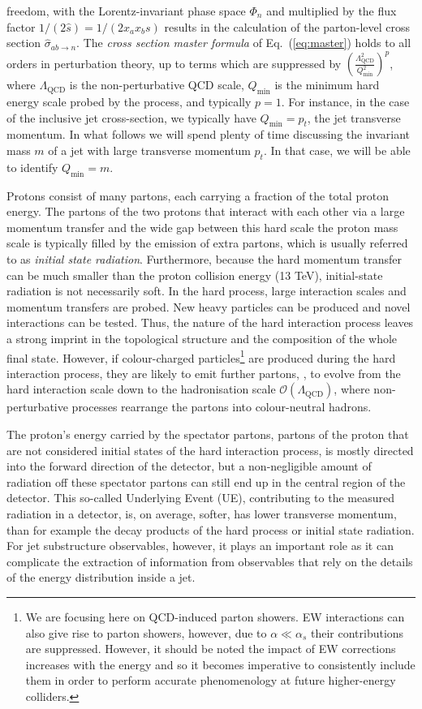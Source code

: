 freedom, with the Lorentz-invariant phase space $\Phi_n$ and
multiplied by the flux factor $1/(2 \hat{s}) = 1/(2 x_a x_b s)$
results in the calculation of the parton-level cross section
$\hat{\sigma}_{ab \to n}$. The {\it cross section master formula} of
Eq.~(\ref{eq:master}) holds to all orders in perturbation theory, up
to terms which are suppressed by
$\left(\frac{\Lambda_\text{QCD}^2}{Q^2_\text{min}}\right)^p$, where $\Lambda_\text{QCD}$ is the non-perturbative QCD scale, $Q_\text{min}$ is the minimum hard energy scale
probed by the process, and typically $p=1$.  
For instance, in the case of the inclusive jet cross-section, we typically have $Q_\text{min}=p_t$, the jet transverse momentum. 
In what follows we will spend plenty of time discussing the invariant mass $m$ of a jet with
large transverse momentum $p_t$. In that case, we will be able to
identify $Q_\text{min}=m$.
%


Protons consist of many partons, each carrying a fraction of the
total proton energy. The partons of the two protons that interact with
each other via a large momentum transfer and the wide gap between this hard scale the proton mass scale is typically filled by the emission of extra partons, which is usually referred to as {\it initial state radiation}. 
Furthermore, because the hard momentum transfer can be much smaller than the proton collision energy (13 TeV), initial-state radiation is not necessarily soft.
%
In the hard process, large interaction scales and momentum transfers are probed. New heavy particles can be produced and novel interactions can be tested. Thus, the nature of the hard interaction process leaves a strong imprint in the topological structure and the composition of the whole final state.
However, if colour-charged particles\footnote{We are focusing here on QCD-induced parton showers. EW interactions can also give rise to parton showers, however, due to $\alpha \ll \alpha_s$ their contributions are suppressed. 
%
However, it should be noted the impact of EW corrections increases with the energy and so it becomes imperative to consistently include them in order to perform accurate phenomenology  at future higher-energy colliders.} are produced during the hard interaction process, they are likely to emit further partons, , to evolve from the hard interaction scale down to the hadronisation scale $\mathcal{O}(\Lambda_\mathrm{QCD})$, where non-perturbative processes rearrange the partons into colour-neutral hadrons. 

The proton's energy carried by the
spectator partons, \ie partons of the proton that are not considered
initial states of the hard interaction process, is mostly directed
into the forward direction of the detector, but a non-negligible
amount of radiation off these spectator partons can still end up in
the central region of the detector. This so-called Underlying
  Event (UE), contributing to the measured radiation in a detector,
is, on average, softer, \ie has lower transverse momentum, than for
example the decay products of the hard process or initial state
radiation. For jet substructure observables, however, it plays an
important role as it can complicate the extraction of information from
observables that rely on the details of the energy distribution inside
a jet.


